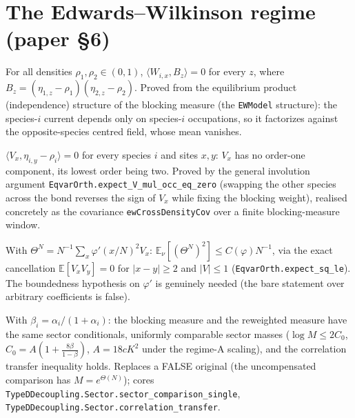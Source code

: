 \chapter{The Edwards--Wilkinson regime (paper \S6)}

\begin{proposition}\label{prop:ew-sym}
  \leanok
  For all densities $\rho_1,\rho_2 \in (0,1)$,
  $\langle W_{i,x}, B_z\rangle = 0$ for every $z$, where
  $B_z = (\eta_{1,z}-\rho_1)(\eta_{2,z}-\rho_2)$.  Proved from the equilibrium
  product (independence) structure of the blocking measure (the \texttt{EWModel}
  structure): the species-$i$ current depends only on species-$i$ occupations, so it
  factorizes against the opposite-species centred field, whose mean vanishes.
\end{proposition}

\begin{lemma}\label{lem:orth}
  \leanok
  $\langle V_x, \eta_{i,y}-\rho_i\rangle = 0$ for every species $i$ and sites $x,y$:
  $V_x$ has no order-one component, its lowest order being two.  Proved by the general
  involution argument \texttt{EqvarOrth.expect\_V\_mul\_occ\_eq\_zero} (swapping the
  other species across the bond reverses the sign of $V_x$ while fixing the blocking
  weight), realised concretely as the covariance \texttt{ewCrossDensityCov} over a
  finite blocking-measure window.
\end{lemma}

\begin{lemma}\label{lem:ew-eqvar}
  \leanok
  With $\Theta^N = N^{-1}\sum_x \varphi'(x/N)^2 V_x$:
  $\mathbb E_\nu[(\Theta^N)^2] \le C(\varphi)N^{-1}$, via the exact cancellation
  $\mathbb E[V_xV_y]=0$ for $|x-y|\ge2$ and $|V|\le1$
  (\texttt{EqvarOrth.expect\_sq\_le}).  The boundedness hypothesis on $\varphi'$ is
  genuinely needed (the bare statement over arbitrary coefficients is false).
\end{lemma}

\begin{lemma}\label{lem:sector}
  \leanok
  With $\beta_i = \alpha_i/(1+\alpha_i)$: the blocking measure and the reweighted
  measure have the same sector conditionals, uniformly comparable sector masses
  ($\log M \le 2C_0$, $C_0 = A(1+\tfrac{8\beta}{1-\beta})$, $A = 18cK^2$ under the
  regime-A scaling), and the correlation transfer inequality holds.  Replaces a FALSE
  original (the uncompensated comparison has $M = e^{\Theta(N)}$); cores
  \texttt{TypeDDecoupling.Sector.sector\_comparison\_single},
  \texttt{TypeDDecoupling.Sector.correlation\_transfer}.
\end{lemma}

